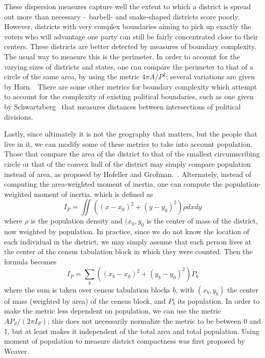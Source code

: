 \documentclass[12pt]{article}
\begin{document}
  These dispersion measures capture well the extent to which a district is spread out more than necessary -- barbell- and snake-shaped districts score poorly.  However, districts with very complex boundaries aiming to pick up exactly the voters who will advantage one party can still be fairly concentrated close to their centers.  These districts are better detected by measures of boundary complexity.  The usual way to measure this is the perimeter.  In order to account for the varying sizes of districts and states, one can compare the perimeter to that of a circle of the same area, by using the metric $4\pi A/P^2$; several variations are given by Horn.~\cite{horn}  There are some other metrics for boundary complexity which attempt to account for the complexity of existing political boundaries, such as one given by Schwartzberg~\cite{schwartzberg} that measures distances between intersections of political divisions.

  Lastly, since ultimately it is not the geography that matters, but the people that live in it, we can modify some of these metrics to take into account population.  Those that compare the area of the district to that of the smallest circumscribing circle or that of the convex hull of the district may simply compare population instead of area, as proposed by Hofeller and Grofman.~\cite{hofeller}.  Alternately, instead of computing the area-weighted moment of inertia, one can compute the population-weighted moment of inertia, which is defined as
  \[I_P = \iint ((x-x_0)^2 + (y-y_0)^2) \rho dx dy \]
  where $\rho$ is the population density and $(x_0, y_0$ is the center of mass of the district, now weighted by population.  In practice, since we do not know the location of each individual in the district, we may simply assume that each person lives at the center of the census tabulation block in which they were counted.  Then the formula becomes
  \[I_P = \sum_{b} ((x_b-x_0)^2 + (y_b-y_0)^2) P_b\]
  where the sum is taken over census tabulation blocks $b$, with $(x_b, y_b)$ the center of mass (weighted by area) of the census block, and $P_b$ its population.  In order to make the metric less dependent on population, we can use the metric $AP_d/(2\pi I_P)$; this does not necessarily normalize the metric to be between 0 and 1, but at least makes it independent of the total area and total population.  Using moment of population to measure district compactness was first proposed by Weaver.~\cite{weaver}
\end{document}

